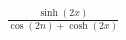 \documentclass[preview]{standalone}
\begin{document}
\begin{align*}
\frac{\sinh(2x)}{\cos(2n)+\cosh(2x)}
\end{align*}
\end{document}
